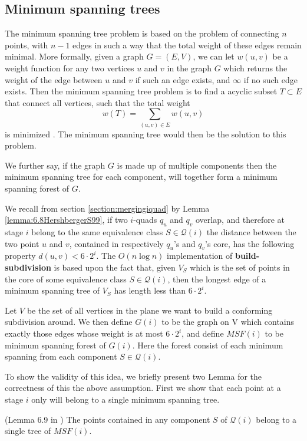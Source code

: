 \subsection{Minimum spanning trees}

The minimum spanning tree problem is based on the problem of connecting $n$ points, with $n - 1$ 
edges in such a way that the total weight of these edges remain minimal. More formally, given a 
graph $G = (E,V)$, we can let $w(u,v)$ be a weight function for any two vertices $u$ and $v$ in the 
graph $G$ which returns the weight of the edge between $u$ and $v$ if such an edge exists, and 
$\infty$ if no such edge exists. Then the minimum spanning tree problem is to find a acyclic subset 
$T \subset E$ that connect all vertices, such that the total weight 
$$ w(T) = \sum_{(u,v) \in E} w(u,v)$$
is minimized \cite{IntroToAlg}. The minimum spanning tree would then be the solution to this problem. 

We further say, if the graph $G$ is made up of multiple components then the minimum spanning tree for 
each component, will together form a minimum spanning forest of $G$.

We recall from section \ref{section:mergingiquad} by Lemma \ref{lemma:6.8HershbergerS99}, if two 
$i$-quads $q_u$ and $q_v$ overlap, and therefore at stage $i$ belong to the same equivalence class $S 
\in \mathcal{Q}(i)$ the distance between the two point $u$ and $v$, contained in respectively $q_u$'s 
and $q_v$'s core, has the following  property $d(u,v) < 6 \cdot 2^i$. The $O(n \log n)$ 
implementation of \textbf{build-subdivision} is based upon the fact that, given $V_S$ which is the 
set of points in the core of some equivalence class $S \in \mathcal{Q}(i)$, then the longest edge of 
a minimum spanning tree of $V_S$ has length less than $6 \cdot 2^i$.

Let $V$ be the set of all vertices in the plane we want to build a conforming subdivision around. We 
then define $G(i)$ to be the graph on V which contains exactly those edges whose weight is at most $6 
\cdot 2^i$, and define $MSF(i)$ to be minimum spanning forest of $G(i)$. Here the forest consist of 
each minimum spanning from each component $S \in \mathcal{Q}(i)$.

To show the validity of this idea, we briefly present two Lemma for the correctness of this the above 
assumption. First we show that each point at a stage $i$ only will belong to a single minimum 
spanning tree.

\begin{Lemma} (Lemma 6.9 in \cite{HershbergerS99}) \label{lemma:6.9HershbergerS99}
The points contained in any component $S$ of $\mathcal{Q}(i)$ belong to a single tree of $MSF(i)$.
\end{Lemma}

